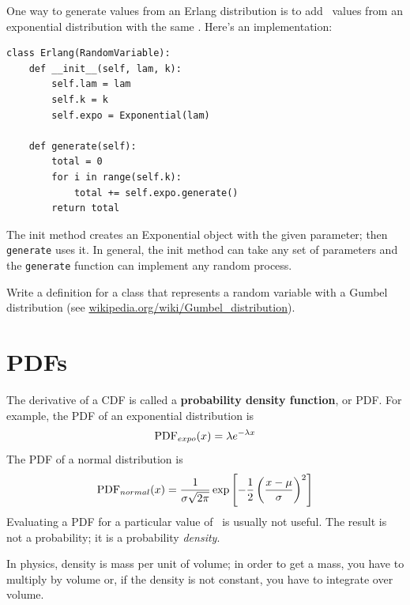 \documentclass[12pt]{book}
\begin{document}
One way to generate values from an Erlang distribution is to add
\kk~values from an exponential distribution with the same \mylambda.
Here's an implementation:
%
\begin{verbatim}
class Erlang(RandomVariable):
    def __init__(self, lam, k):
        self.lam = lam
        self.k = k
        self.expo = Exponential(lam)

    def generate(self):
        total = 0
        for i in range(self.k):
            total += self.expo.generate()
        return total
\end{verbatim}

The init method creates an Exponential object with the given
parameter; then {\tt generate} uses it.  In general, the init method
can take any set of parameters and the {\tt generate} function can
implement any random process.

\begin{exercise}
Write a definition for a class that represents a random variable
with a Gumbel distribution (see \url{wikipedia.org/wiki/Gumbel_distribution}).

\end{exercise}


\section{PDFs}
\label{density}

The derivative of a CDF is called a {\bf probability density function},
or PDF.  For example, the PDF of an exponential distribution is
%
\[ \mathrm{PDF}_{expo}(x) = \lambda e^{-\lambda x}   \]
%
The PDF of a normal distribution is
%
\[ \mathrm{PDF}_{normal}(x) = \frac{1}{\sigma \sqrt{2 \pi}} 
                 \exp \left[ -\frac{1}{2} 
                 \left( \frac{x - \mu}{\sigma} \right)^2 \right]  \]
%
Evaluating a PDF for a particular value of \x~is usually not useful.
The result is not a probability; it is a probability {\em density}.

In physics, density is mass per unit of
volume; in order to get a mass, you have to multiply by volume or,
if the density is not constant, you have to integrate over volume.
\end{document}
